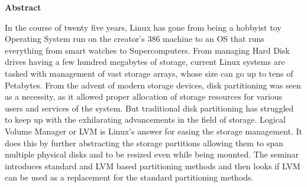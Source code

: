 
\begin{titlepage}
\begin{center}
\textbf{\LARGE{Abstract}}\\[1cm]
\end{center}
\normalsize

In the course of twenty five years, Linux has gone from being a hobbyist toy
Operating System run on the creator's 386 machine to an OS that runs everything
from smart watches to Supercomputers. From managing Hard Disk drives having a
few hundred megabytes of storage, current Linux systems are tasked with
management of vast storage arrays, whose size can go up to tens of Petabytes.
From the advent of modern storage devices, disk partitioning was seen as a
necessity, as it allowed proper allocation of storage resources for various
users and services of the system. But traditional disk partitioning has
struggled to keep up with the exhilarating advancements in the field of storage.
Logical Volume Manager or LVM is Linux's answer for easing the storage
management. It does this by further abstracting the storage partitions allowing
them to span multiple physical disks and to be resized even while being mounted.
The seminar introduces standard and LVM based partitioning methods and then
looks if LVM can be used as a replacement for the standard partitioning methods.

\end{titlepage}

